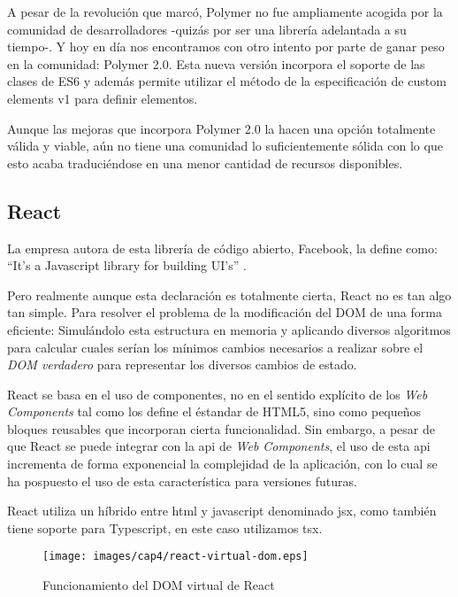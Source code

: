 \bigskip
A pesar de la revolución que marcó, Polymer no fue ampliamente acogida por la comunidad de desarrolladores 
-quizás por ser una librería adelantada a su tiempo-. Y hoy en día nos encontramos con otro intento por 
parte de ganar peso en la comunidad: Polymer 2.0. Esta nueva versión incorpora el soporte de las clases de ES6
y además permite utilizar el método de la especificación de custom elements v1 para definir elementos.

\bigskip
Aunque las mejoras que incorpora Polymer 2.0 la hacen una opción totalmente válida y viable, aún no 
tiene una comunidad lo suficientemente sólida con lo que esto acaba traduciéndose en una menor 
cantidad de recursos disponibles.

\subsection{React}
La empresa autora de esta librería de código abierto, Facebook, la define como: “It’s a Javascript library for building UI’s” \cite{React}. 

\bigskip
Pero realmente aunque esta declaración es totalmente cierta, React no es tan algo tan simple. Para resolver el problema
 de la modificación del DOM de una forma eficiente: Simulándolo esta estructura en memoria y aplicando diversos
 algoritmos para calcular cuales serían los mínimos cambios necesarios a realizar sobre el \textit{DOM verdadero}
 para representar los diversos cambios de estado.

\bigskip
React se basa en el uso de componentes, no en el sentido explícito de los \textit{Web Components} tal como los define 
el éstandar de HTML5, sino como pequeños bloques reusables que incorporan cierta funcionalidad. Sin embargo, a pesar 
de que React se puede integrar con la api de \textit{Web Components}, el uso de esta api incrementa de forma exponencial
la complejidad de la aplicación, con lo cual se ha pospuesto el uso de esta característica para versiones futuras.


\bigskip
React utiliza un híbrido entre html y javascript denominado jsx, como también tiene soporte para 
Typescript, en este caso utilizamos tsx.

\begin{figure}[!th]
\begin{center}
\texttt{[image: images/cap4/react-virtual-dom.eps]}
\caption[Funcionamiento del DOM virtual de React]{Funcionamiento del DOM virtual de React \protect\cite{ReactVirtualDOM}}
\label{fig:Funcionamiento del DOM virtual de React}
\end{center}
\end{figure}

